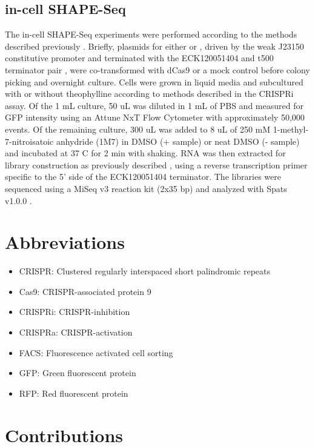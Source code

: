 \documentclass[10pt,oneside]{article}
\begin{document}
\subsection{in-cell SHAPE-Seq}
The in-cell SHAPE-Seq experiments were performed according to the methods described previously \autocite{watters_simultaneous_2016,watters201634}. Briefly, plasmids for either \ligrnaF{} or \ligrnaB{}, driven by the weak J23150 constitutive promoter and terminated with the ECK120051404 and t500 terminator pair \autocite{watters_simultaneous_2016}, were co-transformed with dCas9 or a mock control before colony picking and overnight culture. Cells were grown in liquid media and subcultured with or without theophylline according to methods described in the CRISPRi assay. Of the 1 mL culture, 50 uL was diluted in 1 mL of PBS and measured for GFP intensity using an Attune NxT Flow Cytometer with approximately 50,000 events. Of the remaining culture, 300 uL was added to 8 uL of 250 mM 1-methyl-7-nitroisatoic anhydride (1M7) in DMSO (+ sample) or neat DMSO (- sample) and incubated at 37 C for 2 min with shaking. RNA was then extracted for library construction as previously described \autocite{watters_simultaneous_2016,watters201634}, using a reverse transcription primer specific to the 5' side of the ECK120051404 terminator. The libraries were sequenced using a MiSeq v3 reaction kit (2x35 bp) and analyzed with Spats v1.0.0 \autocite{aviran_Allerton,Lucks_Aviran_2011}.


\section{Abbreviations}

\begin{itemize}
    \item CRISPR: Clustered regularly interspaced short palindromic repeats
    \item Cas9: CRISPR-associated protein 9
    \item CRISPRi: CRISPR-inhibition
    \item CRISPRa: CRISPR-activation
    \item FACS: Fluorescence activated cell sorting
    \item GFP: Green fluorescent protein
    \item RFP: Red fluorescent protein
\end{itemize}

\section{Contributions}
\end{document}
